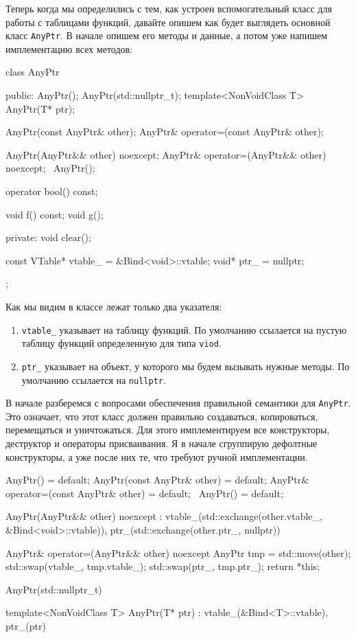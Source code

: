 Теперь когда мы определились с тем, как устроен вспомогательный класс для работы с таблицами функций, давайте опишем как будет выглядеть основной класс \texttt{AnyPtr}.
В начале опишем его методы и данные, а потом уже напишем имплементацию всех методов:
\begin{cppcode}
class AnyPtr {
public:
  AnyPtr();
  AnyPtr(std::nullptr_t);
  template<NonVoidClass T>
  AnyPtr(T* ptr);

  AnyPtr(const AnyPtr& other);
  AnyPtr& operator=(const AnyPtr& other);

  AnyPtr(AnyPtr&& other) noexcept;
  AnyPtr& operator=(AnyPtr&& other) noexcept;
  ~AnyPtr();

  operator bool() const;

  void f() const;
  void g();

private:
  void clear();

  const VTable* vtable_ = &Bind<void>::vtable;
  void* ptr_ = nullptr;
};
\end{cppcode}
Как мы видим в классе лежат только два указателя:
\begin{enumerate}
\item \texttt{vtable\_} указывает на таблицу функций.
По умолчанию ссылается на пустую таблицу функций определенную для типа \texttt{viod}.

\item \texttt{ptr\_} указывает на объект, у которого мы будем вызывать нужные методы.
По умолчанию ссылается на \texttt{nullptr}.
\end{enumerate}
В начале разберемся с вопросами обеспечения правильной семантики для \texttt{AnyPtr}.
Это означает, что этот класс должен правильно создаваться, копироваться, перемещаться и уничтожаться.
Для этого имплементируем все конструкторы, деструктор и операторы присваивания.
Я в начале сгруппирую дефолтные конструкторы, а уже после них те, что требуют ручной имплементации.
\begin{cppcode}
  AnyPtr() = default;
  AnyPtr(const AnyPtr& other) = default;
  AnyPtr& operator=(const AnyPtr& other) = default;
  ~AnyPtr() = default;

  AnyPtr(AnyPtr&& other) noexcept
      : vtable_(std::exchange(other.vtable_, &Bind<void>::vtable)),
        ptr_(std::exchange(other.ptr_, nullptr)) {
  }
  
  AnyPtr& operator=(AnyPtr&& other) noexcept {
    AnyPtr tmp = std::move(other);
    std::swap(vtable_, tmp.vtable_);
    std::swap(ptr_, tmp.ptr_);
    return *this;
  }
  
  AnyPtr(std::nullptr_t) {
  }
  
  template<NonVoidClass T>
  AnyPtr(T* ptr) : vtable_(&Bind<T>::vtable), ptr_(ptr) {
  }
\end{cppcode}
